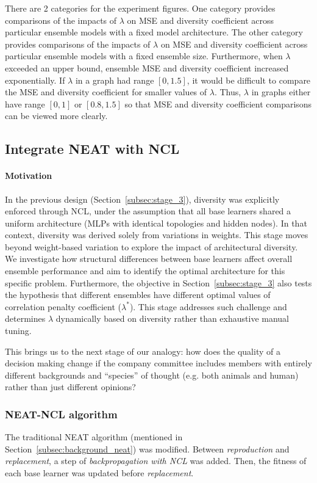 There are 2 categories for the experiment figures. One category provides comparisons of the impacts of $\lambda$ on MSE and diversity coefficient across particular ensemble models with a fixed model architecture. The other category provides comparisons of the impacts of $\lambda$ on MSE and diversity coefficient across particular ensemble models with a fixed ensemble size. Furthermore, when $\lambda$ exceeded an upper bound, ensemble MSE and diversity coefficient increased exponentially. If $\lambda$ in a graph had range $[0, 1.5]$, it would be difficult to compare the MSE and diversity coefficient for smaller values of $\lambda$. Thus, $\lambda$ in graphs either have range $[0, 1]$ or $[0.8, 1.5]$ so that MSE and diversity coefficient comparisons can be viewed more clearly. 


\subsection{Integrate NEAT with NCL}
\label{subsec:stage_4}
\paragraph{Motivation}
In the previous design (Section~\ref{subsec:stage_3}), diversity was explicitly enforced through NCL, under the assumption that all base learners shared a uniform architecture (MLPs with identical topologies and hidden nodes). In that context, diversity was derived solely from variations in weights. This stage moves beyond weight-based variation to explore the impact of architectural diversity. We investigate how structural differences between base learners affect overall ensemble performance and aim to identify the optimal architecture for this specific problem. Furthermore, the objective in Section~\ref{subsec:stage_3} also tests the hypothesis that different ensembles have different optimal values of correlation penalty coefficient ($\lambda^*$). This stage addresses such challenge and determines $\lambda$ dynamically based on diversity rather than exhaustive manual tuning. 

This brings us to the next stage of our analogy: how does the quality of a decision making change if the company committee includes members with entirely different backgrounds and ``species'' of thought (e.g. both animals and human) rather than just different opinions? 


\subsubsection{NEAT-NCL algorithm}
The traditional NEAT algorithm (mentioned in Section~\ref{subsec:background_neat}) was modified. Between \textit{reproduction} and \textit{replacement}, a step of \textit{backpropagation with NCL} was added. Then, the fitness of each base learner was updated before \textit{replacement}. 

